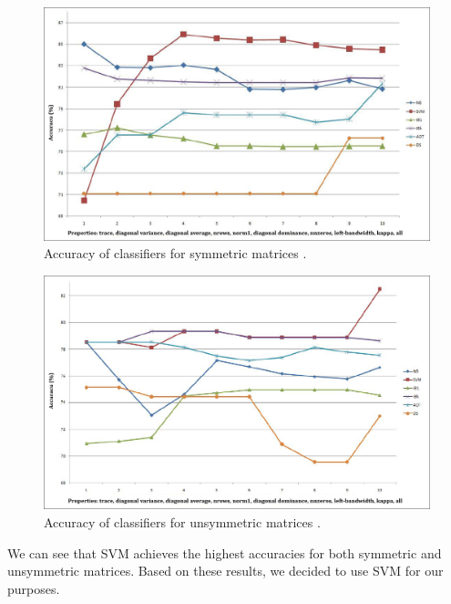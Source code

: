 \begin{figure}[H]\label{brice_1}
  \centering
  \includegraphics[width=6in]{figs/brice_1}
  \caption[Accuracy of classifiers for symmetric matrices.]
   {Accuracy of classifiers for symmetric matrices \cite{singh}.}
\end{figure}

\begin{figure}[H]\label{brice_2}
  \centering
  \includegraphics[width=6in]{figs/brice_2}
  \caption[Accuracy of classifiers for unsymmetric matrices.]
   {Accuracy of classifiers for unsymmetric matrices \cite{singh}.}
\end{figure}

\noindent We can see that SVM achieves the highest accuracies for both symmetric and unsymmetric matrices. Based on these results, we decided to use SVM for our purposes.


